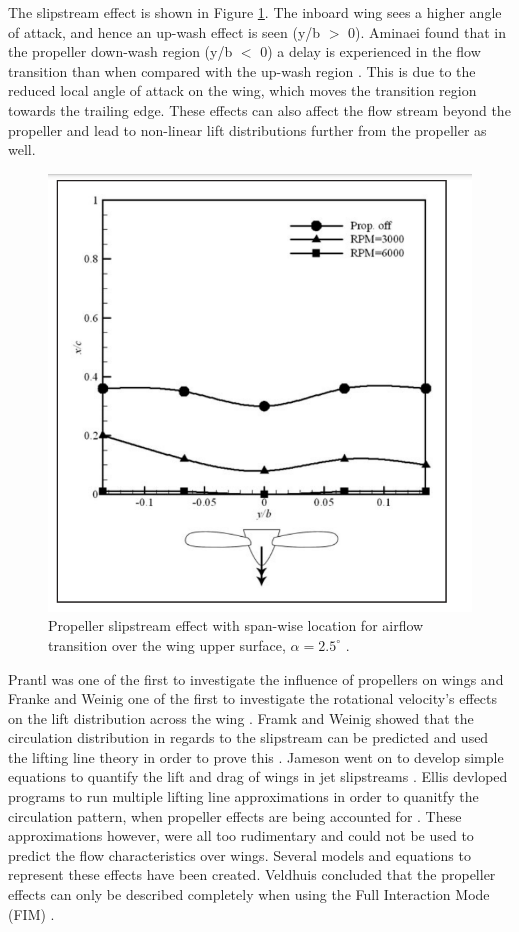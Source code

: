 The slipstream effect is shown in Figure \ref{fig:peoptoyou}. The inboard wing sees a higher angle of attack, and hence an up-wash effect is seen (y/b $>$ 0). Aminaei found that in the propeller down-wash region (y/b $<$ 0) a delay is experienced in the flow transition than when compared with the up-wash region \cite{Aminaei2019}. This is due to the reduced local angle of attack on the wing, which moves the transition region towards the trailing edge. These effects can also affect the flow stream beyond the propeller and lead to non-linear lift distributions further from the propeller as well. 
 
\begin{figure}[H]
  \centering
  \includegraphics[width=0.8\linewidth]{03_LiteratureReview/Figs/propeller effects.png}
  \caption{Propeller slipstream effect with span-wise location for airflow transition over the wing upper surface, $\alpha = 2.5 ^\circ$ \cite{Aminaei2019}.}
  \label{fig:peoptoyou}
\end{figure}

    Prantl was one of the first to investigate the influence of propellers on wings \cite{Prandtl1931} and Franke and Weinig one of the first to investigate the rotational velocity's effects on the lift distribution across the wing \cite{Franke1939}. Framk and Weinig showed that the circulation distribution in regards to the slipstream can be predicted and used the lifting line theory in order to prove this \cite{Franke1939}. Jameson went on to develop simple equations to quantify the lift and drag of wings in jet slipstreams \cite{Jameson1970}. Ellis devloped programs to run multiple lifting line approximations in order to quanitfy the circulation pattern, when propeller effects are being accounted for \cite{Ellis1971}. These approximations however, were all too rudimentary and could not be used to predict the flow characteristics over wings. Several models and equations to represent these effects have been created. Veldhuis concluded that the propeller effects can only be described completely when using the Full Interaction Mode (FIM) \cite{Veldhuis2004}. 


